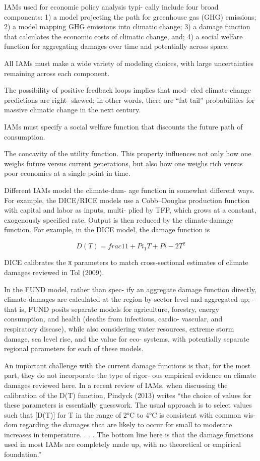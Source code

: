 \documentclass[
]{book}
\begin{document}
IAMs used for economic policy analysis typi-
cally include four broad components: 1) a
model projecting the path for greenhouse gas
(GHG) emissions; 2) a model mapping GHG
emissions into climatic change; 3) a damage
function that calculates the economic costs
of climatic change, and; 4) a social welfare
function for aggregating damages over time
and potentially across space.

All IAMs must
make a wide variety of modeling choices, with
large uncertainties remaining across each
component.

The possibility
of positive feedback loops implies that mod-
eled climate change predictions are right-
skewed; in other words, there are ``fat tail''
probabilities for massive climatic change in
the next century.

IAMs must specify
a social welfare function that discounts the
future path of consumption.

The concavity of the utility
function. This property influences not only
how one weighs future versus current generations,
but also how one weighs rich versus
poor economies at a single point in time.

Different IAMs model the climate-dam-
age function in somewhat different ways.
For example, the DICE/RICE models
use a Cobb--Douglas production function
with capital and labor as inputs, multi-
plied by TFP, which grows at a constant,
exogenously specified rate. Output is then
reduced by the climate-damage function.
For example, in the DICE model, the
damage function is

\[D(T) = frac{1}{1+Pi_1 T + Pi-2 T^2}\]

DICE calibrates the π parameters to match
cross-sectional estimates of climate damages
reviewed in Tol (2009).

In the FUND model, rather than spec-
ify an aggregate damage function directly,
climate damages are calculated at the
region-by-sector level and aggregated up;
­
that is, FUND posits separate models for
agriculture, forestry, energy consumption,
and health (deaths from infectious, cardio-
vascular, and respiratory disease), while also
considering water resources, extreme storm
damage, sea level rise, and the value for eco-
systems, with potentially separate regional
parameters for each of these models.

An important challenge with the current
damage functions is that, for the most part,
they do not incorporate the type of rigor-
ous empirical evidence on climate damages
reviewed here.
In a recent review of IAMs,
when discussing the calibration of the D(T)
function, Pindyck (2013) writes ``the choice
of values for these parameters is essentially
guesswork. The usual approach is to select
values such that {[}D(T){]} for T in the range of
2°C to 4°C is consistent with common wis-
dom regarding the damages that are likely
to occur for small to moderate increases in
temperature. . . . The bottom line here is that
the damage functions used in most IAMs are
completely made up, with no theoretical or
empirical foundation.''
\end{document}
